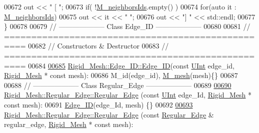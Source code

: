 \begin{DoxyCode}
00672     out << \textcolor{stringliteral}{"    [ "};
00673     \textcolor{keywordflow}{if}( !\hyperlink{classFVCode3D_1_1Rigid__Mesh_1_1Cell_a660774a8bb678b874639c9c1ea713bc6}{M\_neighborsIds}.empty() )
00674         \textcolor{keywordflow}{for}(\textcolor{keyword}{auto} it : \hyperlink{classFVCode3D_1_1Rigid__Mesh_1_1Cell_a660774a8bb678b874639c9c1ea713bc6}{M\_neighborsIds})
00675             out << it << \textcolor{stringliteral}{" "};
00676     out << \textcolor{stringliteral}{"] "} << std::endl;
00677 \}
00678 
00679 \textcolor{comment}{// --------------------   Class Edge\_ID   --------------------}
00680 
00681 \textcolor{comment}{// ==================================================}
00682 \textcolor{comment}{// Constructors & Destructor}
00683 \textcolor{comment}{// ==================================================}
00684 
\hypertarget{RigidMesh_8cpp_source.tex_l00685}{}\hyperlink{classFVCode3D_1_1Rigid__Mesh_1_1Edge__ID_ab69b89922aaeaceb6c393b99edf7abcb}{00685} \hyperlink{classFVCode3D_1_1Rigid__Mesh_1_1Edge__ID_a74231c305881b2ad4788af7245af2f6b}{Rigid\_Mesh::Edge\_ID::Edge\_ID}(\textcolor{keyword}{const} \hyperlink{namespaceFVCode3D_a4bf7e328c75d0fd504050d040ebe9eda}{UInt} edge\_id, 
      \hyperlink{classFVCode3D_1_1Rigid__Mesh}{Rigid\_Mesh} * \textcolor{keyword}{const} mesh):
00686     M\_id(edge\_id), \hyperlink{classFVCode3D_1_1Rigid__Mesh_1_1Cell_ad4a1033c8e506b29487f2be4c4d69c0d}{M\_mesh}(mesh)\{\}
00687 
00688 \textcolor{comment}{// --------------------   Class Regular\_Edge   --------------------}
00689 
\hypertarget{RigidMesh_8cpp_source.tex_l00690}{}\hyperlink{classFVCode3D_1_1Rigid__Mesh_1_1Regular__Edge_a92a9212ce948a5151320a4a29be3218d}{00690} \hyperlink{classFVCode3D_1_1Rigid__Mesh_1_1Regular__Edge_a92a9212ce948a5151320a4a29be3218d}{Rigid\_Mesh::Regular\_Edge::Regular\_Edge} (\textcolor{keyword}{const} 
      \hyperlink{namespaceFVCode3D_a4bf7e328c75d0fd504050d040ebe9eda}{UInt} edge\_Id, \hyperlink{classFVCode3D_1_1Rigid__Mesh}{Rigid\_Mesh} * \textcolor{keyword}{const} mesh):
00691     \hyperlink{classFVCode3D_1_1Rigid__Mesh_1_1Edge__ID}{Edge\_ID}(edge\_Id, mesh) \{\}
00692 
\hypertarget{RigidMesh_8cpp_source.tex_l00693}{}\hyperlink{classFVCode3D_1_1Rigid__Mesh_1_1Regular__Edge_a2b0ad2082f68fbfa1bc9c65cc0b41d30}{00693} \hyperlink{classFVCode3D_1_1Rigid__Mesh_1_1Regular__Edge_a92a9212ce948a5151320a4a29be3218d}{Rigid\_Mesh::Regular\_Edge::Regular\_Edge} (\textcolor{keyword}{const} 
      \hyperlink{classFVCode3D_1_1Rigid__Mesh_1_1Regular__Edge}{Regular\_Edge} & regular\_edge, \hyperlink{classFVCode3D_1_1Rigid__Mesh}{Rigid\_Mesh} * \textcolor{keyword}{const} mesh):

\end{DoxyCode}
